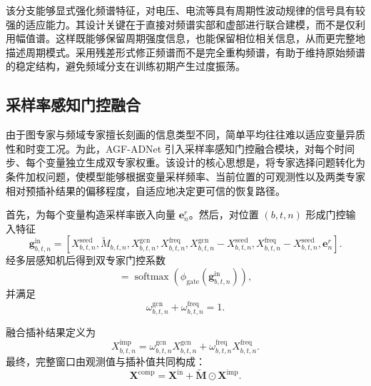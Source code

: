该分支能够显式强化频谱特征，对电压、电流等具有周期性波动规律的信号具有较强的适应能力。其设计关键在于直接对频谱实部和虚部进行联合建模，而不是仅利用幅值谱。这样既能够保留周期强度信息，也能保留相位相关信息，从而更完整地描述周期模式。采用残差形式修正频谱而不是完全重构频谱，有助于维持原始频谱的稳定结构，避免频域分支在训练初期产生过度振荡。

\subsection{采样率感知门控融合}

由于图专家与频域专家擅长刻画的信息类型不同，简单平均往往难以适应变量异质性和时变工况。为此，AGF-ADNet 引入采样率感知门控融合模块，对每个时间步、每个变量独立生成双专家权重。该设计的核心思想是，将专家选择问题转化为条件加权问题，使模型能够根据变量采样频率、当前位置的可观测性以及两类专家相对预插补结果的偏移程度，自适应地决定更可信的恢复路径。

首先，为每个变量构造采样率嵌入向量 $\mathbf{e}_n^{r}$。然后，对位置 $(b,t,n)$ 形成门控输入特征
\begin{equation}
    \mathbf{g}_{b,t,n}^{\mathrm{in}} =
    \left[
        X_{b,t,n}^{\mathrm{seed}},
        \widetilde{M}_{b,t,n},
        X_{b,t,n}^{\mathrm{gcn}},
        X_{b,t,n}^{\mathrm{freq}},
        X_{b,t,n}^{\mathrm{gcn}} - X_{b,t,n}^{\mathrm{seed}},
        X_{b,t,n}^{\mathrm{freq}} - X_{b,t,n}^{\mathrm{seed}},
        \mathbf{e}_n^{r}
    \right].
\end{equation}
经多层感知机后得到双专家门控系数
\begin{equation}
    [\omega_{b,t,n}^{\mathrm{gcn}},\omega_{b,t,n}^{\mathrm{freq}}]
    =
    \operatorname{softmax}\!\left(\phi_{\mathrm{gate}}(\mathbf{g}_{b,t,n}^{\mathrm{in}})\right),
\end{equation}
并满足
\begin{equation}
    \omega_{b,t,n}^{\mathrm{gcn}} + \omega_{b,t,n}^{\mathrm{freq}} = 1.
\end{equation}

融合插补结果定义为
\begin{equation}
    X_{b,t,n}^{\mathrm{imp}}
    =
    \omega_{b,t,n}^{\mathrm{gcn}} X_{b,t,n}^{\mathrm{gcn}}
    +
    \omega_{b,t,n}^{\mathrm{freq}} X_{b,t,n}^{\mathrm{freq}}.
\end{equation}
最终，完整窗口由观测值与插补值共同构成：
\begin{equation}
    \mathbf{X}^{\mathrm{comp}}
    =
    \mathbf{X}^{\mathrm{in}}
    +
    \widetilde{\mathbf{M}} \odot \mathbf{X}^{\mathrm{imp}}.
\end{equation}


